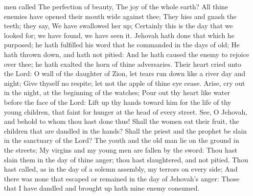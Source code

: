 men called The perfection of beauty, The joy of the whole earth?  All thine enemies have opened their mouth wide against thee; They hiss and gnash the teeth; they say, We have swallowed her up; Certainly this is the day that we looked for; we have found, we have seen it.  Jehovah hath done that which he purposed; he hath fulfilled his word that he commanded in the days of old; He hath thrown down, and hath not pitied: And he hath caused the enemy to rejoice over thee; he hath exalted the horn of thine adversaries.  Their heart cried unto the Lord: O wall of the daughter of Zion, let tears run down like a river day and night; Give thyself no respite; let not the apple of thine eye cease.  Arise, cry out in the night, at the beginning of the watches; Pour out thy heart like water before the face of the Lord: Lift up thy hands toward him for the life of thy young children, that faint for hunger at the head of every street.  See, O Jehovah, and behold to whom thou hast done thus! Shall the women eat their fruit, the children that are dandled in the hands? Shall the priest and the prophet be slain in the sanctuary of the Lord?  The youth and the old man lie on the ground in the streets; My virgins and my young men are fallen by the sword: Thou hast slain them in the day of thine anger; thou hast slaughtered, and not pitied.  Thou hast called, as in the day of a solemn assembly, my terrors on every side; And there was none that escaped or remained in the day of Jehovah’s anger: Those that I have dandled and brought up hath mine enemy consumed. 

